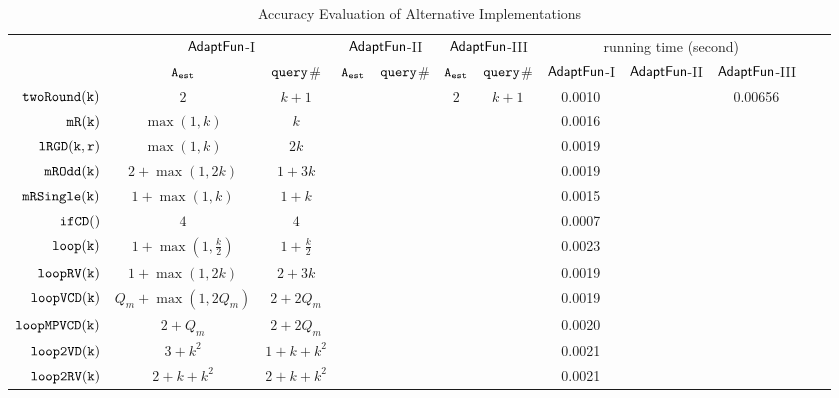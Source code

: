 {\footnotesize
\begin {table}[H]
\vspace{-0.2cm}
    \caption{Accuracy Evaluation of {\THESYSTEM}  Alternative Implementations}
    \vspace{-0.2cm}
        \label{tb:adapt-imp-alternatives}
        \begin{center}
        \centering
{\tiny
        \begin{tabular}{ | >{\tiny}r | c | c | c | c | c | c | c | c | c | c | c |}
        \hline \hline
        \multirow{2}{*}{Program $c$}
         & \multicolumn{2}{c|}{$\textsf{AdaptFun}$-I}
         & \multicolumn{2}{c|}{$\textsf{AdaptFun}$-II}
         & \multicolumn{2}{c|}{$\textsf{AdaptFun}$-III}
         & \multicolumn{3}{c|}{running time (second)} \\ 
         \cline{2-10}
         & {${\mathtt{A_{est}}}$ } & {${\tt query}$\# } & {${\mathtt{A_{est}}}$ } & {${\tt query}$\# } & {${\mathtt{A_{est}}}$ } & {${\tt query}$\# } & $\textsf{AdaptFun}$-I & $\textsf{AdaptFun}$-II & $\textsf{AdaptFun}$-III \\ 
         \cline{5-10}
         \hline \hline
         $  \mathtt{twoRound(k)}$ &  $2$    & $k+1 $  & & & $2$ & $k + 1$ & 0.0010 &  & 0.00656 \\
         $  \mathtt{mR(k)}$ &   $\max(1,k)$ & $k$  &  & & & & 0.0016 & & \\
         $  \mathtt{lRGD(k, r)}$ & $\max(1,k) $ & $ 2k $  &  & & & & 0.0019 & &  \\
         $  \mathtt{mROdd(k)}$  &  $2+\max(1,2k)  $ & $1 + 3 k  $  &  & & & & 0.0019 & &\\
         $  \mathtt{mRSingle(k)}$    & $1+ \max(1, k) $ & $1 + k$  &  & & & & 0.0015 & & \\
         $  \mathtt{ifCD()}$   & $4$ &   $4$  & & & & & 0.0007 & & \\
         $  \mathtt{loop(k)}$ &    $1 + \max(1, \frac{k}{2}) $  &  $1+\frac{k}{2} $ & & & & & 0.0023 &  & \\
         $  \mathtt{loopRV(k)}$   &  $ 1 + \max(1,2k)$ & $2 + 3 k$  &  & & & & 0.0019 & & \\
         $  {\mathtt{loopVCD(k)}} $  &  ${Q_m+\max(1,2Q_m)}$  & $2+2Q_m$   &  & & & & 0.0019 & & \\
         $ {\mathtt{loopMPVCD(k)}}$  &  $2 + Q_m$  & $2+2Q_m$   &   & & & & 0.0020 & & \\
         $  \mathtt{loop2VD(k)}$  &   $3 + k^2$ & $1 + k + k^2$   &  & & & & 0.0021 & & \\
         $  \mathtt{loop2RV(k)}$  &  $ 2 + k +  k^2 $    &  $2 + k + k^2$   &  & & & & 0.0021 & & \\

\end{tabular}}
\end{center}
\end{table}}
